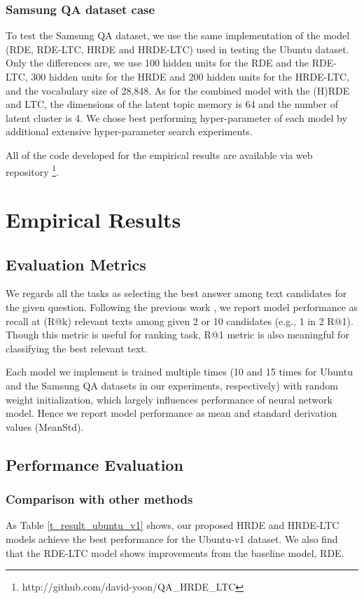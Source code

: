 \documentclass[11pt,a4paper]{article}
\begin{document}
\subsubsection{Samsung QA dataset case} To test the Samsung QA dataset, we use the same implementation of the model (RDE, RDE-LTC, HRDE and HRDE-LTC) used in testing the Ubuntu dataset. Only the differences are, we use 100 hidden units for the RDE and the RDE-LTC, 300 hidden units for the HRDE and 200 hidden units for the HRDE-LTC, and the vocabulary size of 28,848. As for the combined model with the (H)RDE and LTC, the dimensions of the latent topic memory is 64 and the number of latent cluster is 4. We chose best performing hyper-parameter of each model by additional extensive hyper-parameter search experiments.

All of the code developed for the empirical results are available via web repository
\footnote{http://github.com/david-yoon/QA\_HRDE\_LTC}.


\section{Empirical Results}
\label{experiments}
\subsection{Evaluation Metrics}
We regards all the tasks as selecting the best answer among text candidates for the given question. Following the previous work \cite{lowe2015ubuntu}, we report model performance as recall at  (R@k) relevant texts among given 2 or 10 candidates (e.g., 1 in 2 R@1). Though this metric is useful for ranking task, R@1 metric is also meaningful for classifying the best relevant text.

Each model we implement is trained multiple times (10 and 15 times for Ubuntu and the Samsung QA datasets in our experiments, respectively) with random weight initialization, which largely influences performance of neural network model. Hence we report model performance as mean and standard derivation values (MeanStd).


\subsection{Performance Evaluation}
\subsubsection{Comparison with other methods}
As Table \ref{t_result_ubuntu_v1} shows, our proposed HRDE and HRDE-LTC models achieve the best performance for the Ubuntu-v1 dataset. We also find that the RDE-LTC model shows improvements from the baseline model, RDE. 
\end{document}
